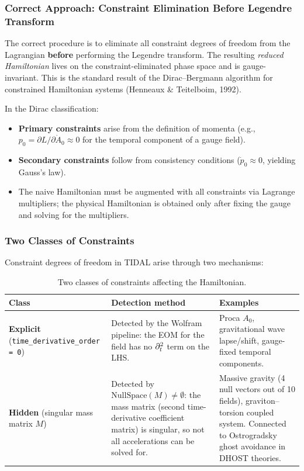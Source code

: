 \subsubsection{Correct Approach: Constraint Elimination Before Legendre Transform}
\label{sec:cf-hamiltonian-correct}

The correct procedure is to eliminate all constraint degrees of freedom from the
Lagrangian \textbf{before} performing the Legendre transform. The resulting
\emph{reduced Hamiltonian} lives on the constraint-eliminated phase space and
is gauge-invariant. This is the standard result of the Dirac--Bergmann
algorithm for constrained Hamiltonian systems (Henneaux \& Teitelboim, 1992).

In the Dirac classification:
\begin{itemize}
  \item \textbf{Primary constraints} arise from the definition of momenta
    (e.g., $p_0 = \partial L / \partial \dot{A}_0 \approx 0$ for the temporal
    component of a gauge field).
  \item \textbf{Secondary constraints} follow from consistency conditions
    ($\dot{p}_0 \approx 0$, yielding Gauss's law).
  \item The naive Hamiltonian must be augmented with all constraints via
    Lagrange multipliers; the physical Hamiltonian is obtained only after
    fixing the gauge and solving for the multipliers.
\end{itemize}

\subsubsection{Two Classes of Constraints}
\label{sec:cf-hamiltonian-classes}

Constraint degrees of freedom in TIDAL arise through two mechanisms:

\begin{table}[htbp]
\centering
\caption{Two classes of constraints affecting the Hamiltonian.}
\label{tab:cf-constraint-classes}
\begin{tabular}{@{}lp{4.5cm}p{5cm}@{}}
\toprule
Class & Detection method & Examples \\
\midrule
\textbf{Explicit} (\texttt{time\_derivative\_order = 0}) &
  Detected by the Wolfram pipeline: the EOM for the field has no $\partial_t^2$
  term on the LHS. &
  Proca $A_0$, gravitational wave lapse/shift, gauge-fixed temporal
  components. \\
\textbf{Hidden} (singular mass matrix $M$) &
  Detected by $\mathrm{NullSpace}(M) \neq \emptyset$: the mass matrix
  (second time-derivative coefficient matrix) is singular, so not all
  accelerations can be solved for. &
  Massive gravity (4 null vectors out of 10 fields), graviton--torsion
  coupled system. Connected to Ostrogradsky ghost avoidance in DHOST
  theories. \\
\bottomrule
\end{tabular}
\end{table}

